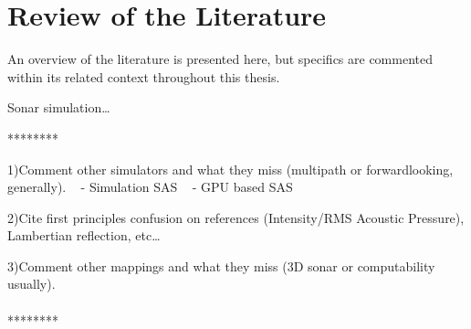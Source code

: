 \section{Review of the Literature}

An overview of the literature is presented here, but specifics are commented
within its related context throughout this thesis.

Sonar simulation\ldots

********

1)Comment other simulators and what they miss (multipath or forwardlooking,
generally).
~\citet{Coiras2009} - Simulation SAS
~\citet{coiras2009gpu} - GPU based SAS

2)Cite first principles confusion on references (Intensity/RMS Acoustic
Pressure), Lambertian reflection, etc\ldots

3)Comment other mappings and what they miss (3D sonar or computability usually).
\\\\
******** 

